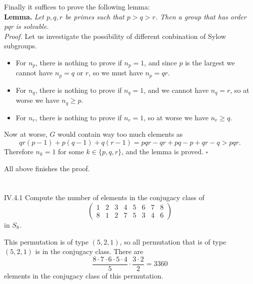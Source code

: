 \begin{pf}
Finally it suffices to prove the following lemma: \\
\textbf{Lemma. }\textit{
Let $p,q,r$ be primes such that $p > q > r$. Then a group that has order pqr is solvable.
}\\
\emph{Proof. \;\;}Let us investigate the possibility of different conbination of Sylow subgroups. 
\begin{itemize}
\setlength\itemsep{0pt}
\item For $n_p$, there is nothing to prove if $n_p = 1$, and since $p$ is the largest we cannot have $n_p = q$ or $r$, so we must have $n_p = qr$.
\item For $n_q$, there is nothing to prove if $n_q = 1$, and we cannot have $n_q = r$, so at worse we have $n_q \geq p$.
\item For $n_r$, there is nothing to prove if $n_r = 1$, so at worse we have $n_r \geq q$.
\end{itemize}
Now at worse, $G$ would contain way too much elements as
\[
qr(p-1) + p(q-1) + q(r-1) = pqr - qr + pq - p + qr - q > pqr.
\]
Therefore $n_k = 1$ for some $k \in \{p,q,r\}$, and the lemma is proved. \hfill\ensuremath{\square}

All above finishes the proof.
\end{pf}


\section{}

\begin{problem}{IV.4.1}
Compute the number of elements in the conjugacy class of 
\[
\begin{pmatrix}
1 & 2 & 3 & 4 & 5 & 6 & 7 & 8 \\
8 & 1 & 2 & 7 & 5 & 3 & 4 & 6
\end{pmatrix}
\]
in $S_8$.
\end{problem}
\begin{sol}
This permutation is of type $(5,2,1)$, so all permutation that is of type $(5,2,1)$ is in the conjugacy class. There are 
\[
\frac{8\cdot 7 \cdot 6 \cdot 5 \cdot 4}{5} \cdot \frac{3 \cdot 2}{2} = 3360
\]
elements in the conjugacy class of this permutation.
\end{sol}

